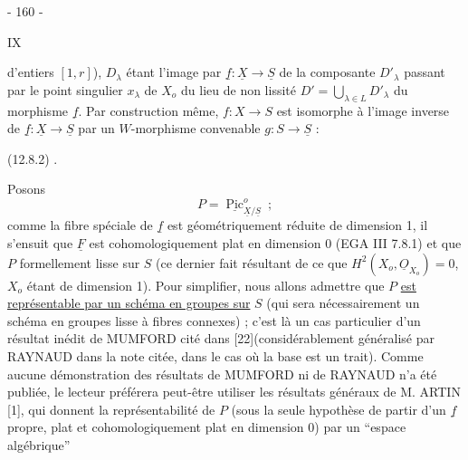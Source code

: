 \begin{center}- 160 -\end{center}\hfill IX

d'entiers $[1,r]$), $D_\lambda$ étant l'image par $\underline f:\underline X\longrightarrow\underline S$ de la composante $D'_\lambda$ passant par le point singulier $x_\lambda$ de $X_o$ du lieu de non lissité $D'=\bigcup_{\lambda\in L}D'_\lambda$ du morphisme $\underline f$. Par construction même, $f:X\longrightarrow S$ est isomorphe à l'image inverse de $\underline f:\underline X\longrightarrow\underline S$ par un $W$-morphisme convenable $g:S\longrightarrow\underline S$ :

(12.8.2)
.

Posons
\[\tag{12.8.3} P=\underline{\operatorname{Pic}}^o_{\underline X/\underline S}\ ;\]
comme la fibre spéciale de $\underline f$ est géométriquement réduite de dimension 1, il s'ensuit que $\underline F$ est cohomologiquement plat en dimension 0 (EGA III 7.8.1) et que $P$ formellement lisse sur $S$ (ce dernier fait résultant de ce que $H^2(X_o,\underline O_{X_o})=0$, $X_o$ étant de dimension 1). Pour simplifier, nous allons admettre que $P$ \uline{est représentable par un schéma en groupes sur} $S$ (qui sera nécessairement un schéma en groupes lisse à fibres connexes) ; c'est là un cas particulier d'un résultat inédit de MUMFORD cité dans [22](considérablement généralisé par RAYNAUD dans la note citée, dans le cas où la base est un trait). Comme aucune démonstration des résultats de MUMFORD ni de RAYNAUD n'a été publiée, le lecteur préférera peut-être utiliser les résultats généraux de M. ARTIN [1], qui donnent la représentabilité de $P$ (sous la seule hypothèse de partir d'un $\underline f$ propre, plat et cohomologiquement plat en dimension 0) par un ``espace algébrique''

